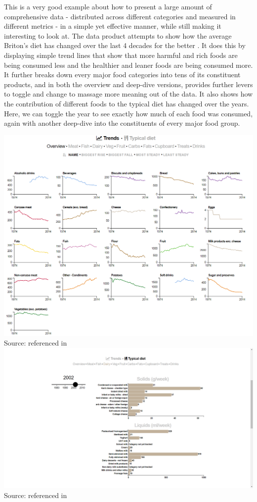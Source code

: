 \documentclass[]{book}
\theoremstyle{definition}
\theoremstyle{definition}
\theoremstyle{definition}
\theoremstyle{remark}
\begin{document}
This is a very good example about how to present a large amount of
comprehensive data - distributed across different categories and
measured in different metrics - in a simple yet effective manner, while
still making it interesting to look at. The data product attempts to
show how the average Briton's diet has changed over the last 4 decades
for the better \citep{britain_diet_2016}. It does this by displaying
simple trend lines that show that more harmful and rich foods are being
consumed less and the healthier and leaner foods are being consumed
more. It further breaks down every major food categories into tens of
its constituent products, and in both the overview and deep-dive
versions, provides further levers to toggle and change to massage more
meaning out of the data. It also shows how the contribution of different
foods to the typical diet has changed over the years. Here, we can
toggle the year to see exactly how much of each food was consumed, again
with another deep-dive into the constituents of every major food group.

\includegraphics{images/britain-diet-data-trends.PNG} Source:
\citep{britain-diet-data-trends} referenced in \citep{britain_diet_2016}
\includegraphics{images/britain-diet-data-typical_diet.png} Source:
\citep{britain-diet-data-typical_diet} referenced in
\citep{britain_diet_2016}
\end{document}
